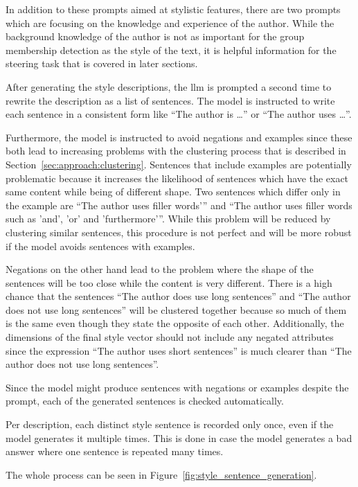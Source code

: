 In addition to these prompts aimed at stylistic features, there are two prompts which are focusing on the knowledge and experience of the author. While the background knowledge of the author is not as important for the group membership detection as the style of the text, it is helpful information for the steering task that is covered in later sections.

After generating the style descriptions, the \ac{llm} is prompted a second time to rewrite the description as a list of sentences. The model is instructed to write each sentence in a consistent form like \enquote{The author is \ldots} or \enquote{The author uses \ldots}.

Furthermore, the model is instructed to avoid negations and examples since these both lead to increasing problems with the clustering process that is described in Section~\ref{sec:approach:clustering}.
Sentences that include examples are potentially problematic because it increases the likelihood of sentences which have the exact same content while being of different shape. %
Two sentences which differ only in the example are \enquote{The author uses filler words'} and \enquote{The author uses filler words such as 'and', 'or' and 'furthermore'}. While this problem will be reduced by clustering similar sentences, this procedure is not perfect and will be more robust if the model avoids sentences with examples.

Negations on the other hand lead to the problem where the shape of the sentences will be too close while the content is very different. There is a high chance that the sentences \enquote{The author does use long sentences} and \enquote{The author does not use long sentences} will be clustered together because so much of them is the same even though they state the opposite of each other.
Additionally, the dimensions of the final style vector should not include any negated attributes since the expression \enquote{The author uses short sentences} is much clearer than \enquote{The author does not use long sentences}.

Since the model might produce sentences with negations or examples despite the prompt, each of the generated sentences is checked automatically.

Per description, each distinct style sentence is recorded only once, even if the model generates it multiple times. This is done in case the model generates a bad answer where one sentence is repeated many times.

The whole process can be seen in Figure~\ref{fig:style_sentence_generation}.

